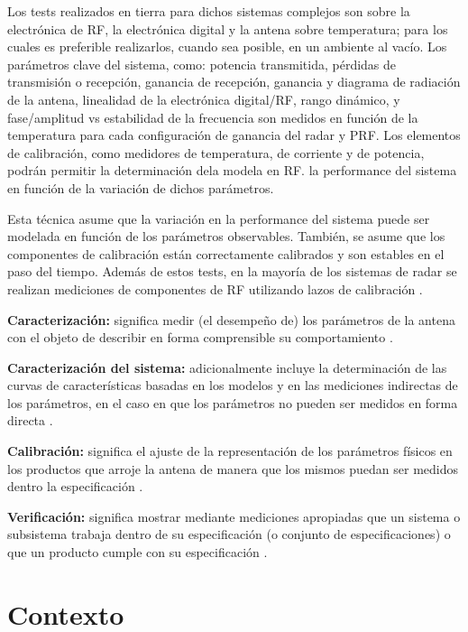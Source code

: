 Los tests realizados en tierra para dichos sistemas complejos son sobre la electrónica de RF, la electrónica digital y la
antena sobre temperatura; para los cuales es preferible realizarlos, cuando sea posible, en un ambiente al vacío. Los
parámetros clave del sistema, como: potencia transmitida, pérdidas de transmisión o recepción, ganancia de recepción,
ganancia y diagrama de radiación de la antena, linealidad de la electrónica digital/RF, rango dinámico, y fase/amplitud vs
estabilidad de la frecuencia son medidos en función de la temperatura para cada configuración de ganancia del radar y PRF. Los elementos de calibración, como medidores de temperatura, de corriente y de potencia, podrán
permitir la determinación dela modela en RF. la performance del sistema en función de la variación de dichos parámetros.

Esta técnica asume que la variación en la performance del sistema puede ser modelada en función de los parámetros observables.
También, se asume que los componentes de calibración están correctamente calibrados y son estables en el paso del tiempo.
Además de estos tests, en la mayoría de los sistemas de radar se realizan mediciones de componentes de RF utilizando lazos de
calibración \cite{Curlander1991}.

{\textbf{Caracterización:}} significa medir (el desempeño de) los parámetros de la antena con el objeto de describir en
forma comprensible su comportamiento \cite{Mittermayer2007}.

{\textbf{Caracterización del sistema:}} adicionalmente incluye la determinación de las curvas de características basadas
en los modelos y en las mediciones indirectas de los parámetros, en el caso en que los parámetros no pueden ser medidos
en forma directa \cite{Mittermayer2007}.

{\textbf{Calibración:}} significa el ajuste de la representación de los parámetros físicos en los productos que arroje la
antena de manera que los mismos puedan ser medidos dentro la especificación \cite{Mittermayer2007}.

{\textbf{Verificación:}} significa mostrar mediante mediciones apropiadas que un sistema o subsistema trabaja dentro de su
especificación (o conjunto de especificaciones) o que un producto cumple con su especificación \cite{Mittermayer2007}.

\section{Contexto} \label{sc:context}

